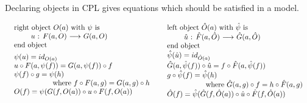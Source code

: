 Declaring objects in CPL gives equations which should be satisfied in a
model.

\begin{displaymath}
\begin{tabular}{ll}
\begin{tabular}{l}
right object $O(a)$ with $\psi$ is \\
\makebox[2em]{} $u$ : $F(a,O)$ $\longrightarrow$ $G(a,O)$ \\
end object \\
\end{tabular}
&
\begin{tabular}{l}
left object $\hat{O}(a)$ with $\hat{\psi}$ is \\
\makebox[2em]{} $\hat{u}$ : $\hat{F}(a,\hat{O})$ $\longrightarrow$
	$\hat{G}(a,\hat{O})$ \\
end object \\
\end{tabular}
\\
\begin{tabular}{l}
$\psi (u) = id_{O(a)}$ \\
$u\circ F(a,\psi (f)) = G(a,\psi (f))\circ f$ \\
$\psi (f)\circ g = \psi (h)$ \\
\makebox[5em]{} where $f\circ F(a,g) = G(a,g)\circ h$ \\
$O(f) = \psi (G(f,O(a))\circ u\circ F(f,O(a))$ \\
\end{tabular}
&
\begin{tabular}{l}
$\hat{\psi}(\hat{u}) = id_{\hat{O}(a)}$ \\
$\hat{G}(a,\hat{\psi}(f))\circ \hat{u} = f\circ \hat{F}(a,\hat{\psi}(f))$ \\
$g\circ \hat{\psi}(f) = \hat{\psi}(h)$ \\
\makebox[5em]{} where $\hat{G}(a,g)\circ f = h\circ \hat{F}(a,g)$ \\
$\hat{O}(f) = \hat{\psi}(\hat{G}(f,\hat{O}(a))\circ \hat{u}\circ
	\hat{F}(f,\hat{O}(a))$ \\
\end{tabular}
\end{tabular}
\end{displaymath}


